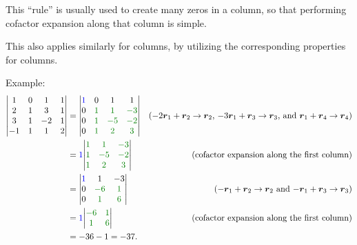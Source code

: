 \begin{enumerate}
\begin{remark}
\item This ``rule'' is usually used to create many zeros in a column, so that
performing cofactor expansion along that column is simple.
\item This also applies similarly for columns, by utilizing the corresponding
properties for columns.
\end{remark}
Example:
\begin{align*}
\mqty|1&0&1&1\\ 2&1&3&1\\ 3&1&-2&1\\ -1&1&1&2|
&=\mqty|\blc{1}&0&1&1\\ 0&\gc{1}&\gc{1}&\gc{-3}\\ 0&\gc{1}&\gc{-5}&\gc{-2}\\ 0&\gc{1}&\gc{2}&\gc{3}|&\text{(\(-2\vect{r}_1+\vect{r}_2\to\vect{r}_{2}\), \(-3\vect{r}_{1}+\vect{r}_{3}\to\vect{r}_{3}\), and \(\vect{r}_{1}+\vect{r}_{4}\to\vect{r}_{4}\))}\\
&=\blc{1}\mqty|\gc{1}&\gc{1}&\gc{-3}\\ \gc{1}&\gc{-5}&\gc{-2}\\ \gc{1}&\gc{2}&\gc{3}|&\text{(cofactor expansion along the first column)}\\
&=\mqty|\blc{1}&1&-3\\ 0&\gc{-6}&\gc{1}\\ 0&\gc{1}&\gc{6}|&\text{(\(-\vect{r}_{1}+\vect{r}_{2}\to\vect{r}_{2}\) and \(-\vect{r}_{1}+\vect{r}_{3}\to\vect{r}_{3}\))}\\
&=\blc{1}\mqty|\gc{-6}&\gc{1}\\ \gc{1}&\gc{6}|&\text{(cofactor expansion along the first column)}\\
&=-36-1=-37.
\end{align*}
\end{enumerate}
